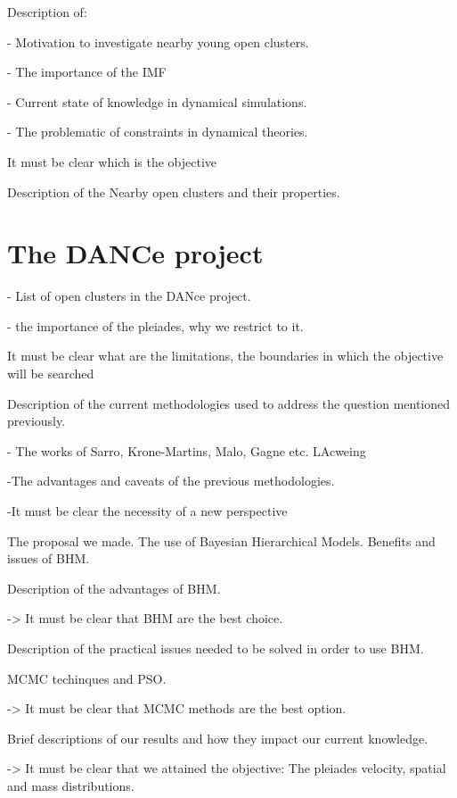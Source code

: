 Description of:

- Motivation to investigate nearby young open clusters.

- The importance of the IMF

- Current state of knowledge in dynamical simulations.

- The problematic of constraints in dynamical theories.

It must be clear which is the objective

Description of the Nearby open clusters and their properties.

\section{The DANCe project}

- List of open clusters in the DANce project.

- the importance of the pleiades, why we restrict to it.

It must be clear what are the limitations, the boundaries in which the objective will be searched

Description of the current methodologies used to address the question mentioned previously.

- The works of Sarro, Krone-Martins, Malo, Gagne etc. LAcweing

-The advantages and caveats of the previous methodologies. 

-It must be clear the necessity of a new perspective

The proposal we made. The use of Bayesian Hierarchical Models. Benefits and issues of BHM.

Description of the advantages of BHM.

-> It must be clear that BHM are the best choice.

Description of the practical issues needed to be solved in order to use BHM.

MCMC techinques and  PSO.

-> It must be clear that MCMC methods are the best option.

Brief descriptions of our results and how they impact our current knowledge.

-> It must be clear that we attained the objective: The pleiades velocity, spatial and mass distributions.
 



